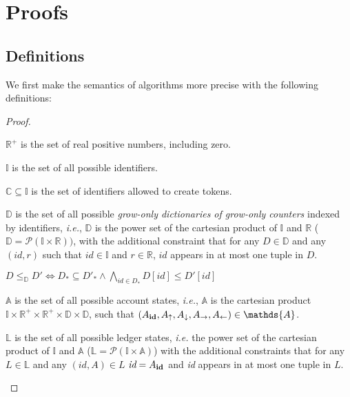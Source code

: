 \documentclass[9pt, oneside]{article}   	%
\begin{document}
\section{Proofs}
\label{sec:proofs}

\subsection{Definitions}

We first make the semantics of algorithms more precise with the following definitions:
\begin{proof}
	\begin{pfenum}
		\item $\mathds{R}^+$ is the set of real positive numbers, including zero.
		\item $\mathds{I}$ is the set of all possible identifiers.
		\item $\mathds{C} \subseteq \mathds{I}$ is the set of identifiers allowed to create tokens.
		\item $\mathds{D}$ is the set of all possible \textit{grow-only dictionaries of grow-only counters} indexed by identifiers, \textit{i.e.}, $\mathds{D}$ is the power set of the cartesian product of $\mathds{I}$ and $\mathds{R}$ ($\mathds{D} = \mathcal{P}(\mathds{I} \times \mathds{R}))$, with the additional constraint that for any $D \in \mathds{D}$ and any $(\textit{id},r)$ such that $\textit{id} \in \mathds{I}$ and $r \in \mathds{R}$, $id$ appears in at most one tuple in $D$.
		\item $D \leq_\mathds{D} D' \Leftrightarrow D_* \subseteq D'_* \wedge \bigwedge\limits_{id \in D_*} D[id] \leq D'[id] $
		\item $\mathds{A}$ is the set of all possible account states, \textit{i.e.}, $\mathds{A}$ is the cartesian product $\mathds{I} \times \mathds{R}^+ \times \mathds{R}^+ \times \mathds{D} \times \mathds{D}$, such that $(A_{\footnotesize \textbf{id}}, A_\uparrow, A_\downarrow, A_\rightarrow, A_\leftarrow) \in \mathds{A}$. 
		\item $\mathds{L}$ is the set of all possible ledger states, \textit{i.e.} the power set of the cartesian product of $\mathds{I}$ and $\mathds{A}$ ($\mathds{L} = \mathcal{P}(\mathds{I} \times \mathds{A})$) with the additional constraints that for any $L \in \mathds{L}$ and any $(\textit{id}, A) \in L$ $\textit{id} = A_{\footnotesize \textbf{id}}$ and \textit{id} appears in at most one tuple in $L$.
	\end{pfenum}
\end{proof}
\end{document}

